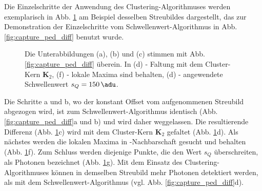 \noindent
Die Einzelschritte der Anwendung des Clustering-Algorithmuses werden exemplarisch in Abb. \ref{fig:capture_ped_diff_clustering} am Beispiel desselben Streubildes dargestellt, das zur Demonstration der Einzelschritte vom Schwellen\-wert-Algorithmus in Abb. \ref{fig:capture_ped_diff} benutzt wurde.
\begin{figure}[H]
    \centering
    
    \caption{Die Unterabbildungen (a), (b) und (c) stimmen mit Abb. \ref{fig:capture_ped_diff} überein. In (d) - Faltung mit dem Cluster-Kern $\mathbf{K}_2$, (f) - lokale Maxima sind behalten, (d) - angewendete Schwellenwert $s_Q = \SI{150}{\adu}$.}
    \label{fig:capture_ped_diff_clustering}
\end{figure}
\noindent
Die Schritte a und b, wo der konstant Offset vom aufgenommenen Streubild abgezogen wird, ist zum Schwellenwert-Algorithmus identisch (Abb. \ref{fig:capture_ped_diff}a und b) und wird daher weggelassen. Die resultierende Differenz (Abb. \ref{fig:capture_ped_diff_clustering}c) wird mit dem Cluster-Kern  $\mathbf{K}_2$ gefaltet (Abb. \ref{fig:capture_ped_diff_clustering}d). Als nächstes werden die lokalen Maxima in -Nachbarschaft gesucht und behalten (Abb. \ref{fig:capture_ped_diff_clustering}f). Zum Schluss werden diejenige Punkte, die den Wert $s_Q$ überschreiten, als Photonen bezeichnet (Abb. \ref{fig:capture_ped_diff_clustering}g). Mit dem Einsatz des Clustering-Algorithmuses können in demselben Streubild mehr Photonen detektiert werden, als mit dem Schwellenwert-Algorithmus (vgl. Abb. \ref{fig:capture_ped_diff}d).


